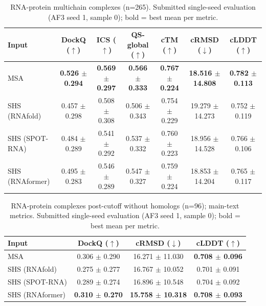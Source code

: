 \begin{table}[htbp]
\centering
\caption{RNA-protein multichain complexes (n=265). Submitted single-seed evaluation (AF3 seed 1, sample 0); bold = best mean per metric.}
\label{tab:rna_protein_multichain_complexes}
\begin{tabular}{lcccccc}
\toprule
Input & DockQ ($\uparrow$) & ICS ($\uparrow$) & QS-global ($\uparrow$) & cTM ($\uparrow$) & cRMSD ($\downarrow$) & cLDDT ($\uparrow$) \\
\midrule
MSA & \textbf{0.526 $\pm$ 0.294} & \textbf{0.569 $\pm$ 0.297} & \textbf{0.566 $\pm$ 0.333} & \textbf{0.767 $\pm$ 0.224} & \textbf{18.516 $\pm$ 14.808} & \textbf{0.782 $\pm$ 0.113} \\
SHS (RNAfold) & 0.457 $\pm$ 0.298 & 0.508 $\pm$ 0.308 & 0.506 $\pm$ 0.343 & 0.754 $\pm$ 0.229 & 19.279 $\pm$ 14.273 & 0.752 $\pm$ 0.119 \\
SHS (SPOT-RNA) & 0.484 $\pm$ 0.289 & 0.541 $\pm$ 0.292 & 0.537 $\pm$ 0.332 & 0.760 $\pm$ 0.223 & 18.956 $\pm$ 14.528 & 0.766 $\pm$ 0.106 \\
SHS (RNAformer) & 0.495 $\pm$ 0.283 & 0.546 $\pm$ 0.289 & 0.547 $\pm$ 0.327 & 0.759 $\pm$ 0.224 & 18.853 $\pm$ 14.204 & 0.765 $\pm$ 0.117 \\
\bottomrule
\end{tabular}
\end{table}

\begin{table}[htbp]
\centering
\caption{RNA-protein complexes post-cutoff without homologs (n=96); main-text metrics. Submitted single-seed evaluation (AF3 seed 1, sample 0); bold = best mean per metric.}
\label{tab:rna_protein_complexes_post_cutoff_without_homologs_reduced}
\begin{tabular}{lccc}
\toprule
Input & DockQ ($\uparrow$) & cRMSD ($\downarrow$) & cLDDT ($\uparrow$) \\
\midrule
MSA & 0.306 $\pm$ 0.290 & 16.271 $\pm$ 11.030 & \textbf{0.708 $\pm$ 0.096} \\
SHS (RNAfold) & 0.275 $\pm$ 0.277 & 16.767 $\pm$ 10.052 & 0.701 $\pm$ 0.091 \\
SHS (SPOT-RNA) & 0.289 $\pm$ 0.274 & 16.896 $\pm$ 10.548 & 0.704 $\pm$ 0.092 \\
SHS (RNAformer) & \textbf{0.310 $\pm$ 0.270} & \textbf{15.758 $\pm$ 10.318} & \textbf{0.708 $\pm$ 0.093} \\
\bottomrule
\end{tabular}
\end{table}

